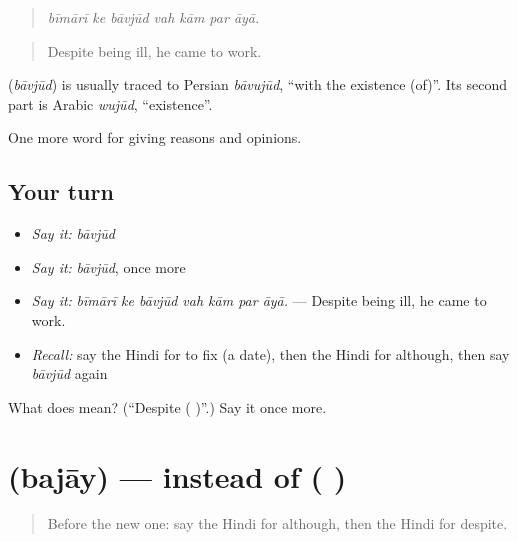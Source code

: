 \begin{quote}
\emph{bīmārī ke bāvjūd vah kām par āyā.}
\end{quote}

\begin{quote}
Despite being ill, he came to work.
\end{quote}

\begin{cousinweb}
\textbf{} (\emph{bāvjūd}) is usually traced to Persian \emph{bāvujūd}, \textquotedblleft{}with the existence (of)\textquotedblright{}. Its second part is Arabic \emph{wujūd}, \textquotedblleft{}existence\textquotedblright{}.
\end{cousinweb}

\begin{grammarlens}[title={What you've built}]
One more word for giving reasons and opinions.
\end{grammarlens}

\subsection*{Your turn}
\begin{itemize}
\raggedright
  \item \emph{Say it:} \emph{bāvjūd}
  \item \emph{Say it:} \emph{bāvjūd}, once more
  \item \emph{Say it:} \emph{bīmārī ke bāvjūd vah kām par āyā.} — Despite being ill, he came to work.
  \item \emph{Recall:} say the Hindi for to fix (a date), then the Hindi for although, then say \emph{bāvjūd} again
\end{itemize}

\begin{tcolorbox}[breakable,colback=teal!4,colframe=teal!35!black,title={Before you move on}]
What does  mean? (\textquotedblleft{}Despite ( )\textquotedblright{}.) Say it once more.
\end{tcolorbox}
\section[\texorpdfstring{\hi{बजाय} (bajāy)}{बजाय (bajāy)}]{ (bajāy) — instead of ( )}

\label{lesson:HI-C371-bajay}



\begin{quote}
Before the new one: say the Hindi for although, then the Hindi for despite.
\end{quote}


